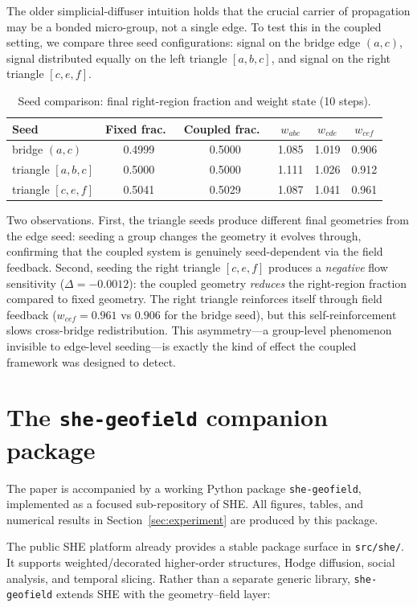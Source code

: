 \documentclass[11pt]{article}
\begin{document}
The older simplicial-diffuser intuition holds that the crucial carrier of propagation may be a bonded micro-group, not a single edge.  To test this in the coupled setting, we compare three seed configurations: signal on the bridge edge $(a,c)$, signal distributed equally on the left triangle $[a,b,c]$, and signal on the right triangle $[c,e,f]$.

\begin{table}[ht]
\centering
\small
\caption{Seed comparison: final right-region fraction and weight state (10 steps).}
\label{tab:seeds}
\begin{tabular}{lccccc}
\toprule
Seed & Fixed frac.\ & Coupled frac.\ & $w_{abc}$ & $w_{cde}$ & $w_{cef}$ \\
\midrule
bridge $(a,c)$ & 0.4999 & 0.5000 & 1.085 & 1.019 & 0.906 \\
triangle $[a,b,c]$ & 0.5000 & 0.5000 & 1.111 & 1.026 & 0.912 \\
triangle $[c,e,f]$ & 0.5041 & 0.5029 & 1.087 & 1.041 & 0.961 \\
\bottomrule
\end{tabular}
\end{table}

Two observations.  First, the triangle seeds produce different final geometries from the edge seed: seeding a group changes the geometry it evolves through, confirming that the coupled system is genuinely seed-dependent via the field feedback.  Second, seeding the right triangle $[c,e,f]$ produces a \emph{negative} flow sensitivity ($\Delta=-0.0012$): the coupled geometry \emph{reduces} the right-region fraction compared to fixed geometry.  The right triangle reinforces itself through field feedback ($w_{cef}=0.961$ vs $0.906$ for the bridge seed), but this self-reinforcement slows cross-bridge redistribution.  This asymmetry---a group-level phenomenon invisible to edge-level seeding---is exactly the kind of effect the coupled framework was designed to detect.

\section{The \texttt{she-geofield} companion package}

The paper is accompanied by a working Python package \texttt{she-geofield}, implemented as a focused sub-repository of SHE.  All figures, tables, and numerical results in Section~\ref{sec:experiment} are produced by this package.

The public SHE platform already provides a stable package surface in \texttt{src/she/}.  It supports weighted/decorated higher-order structures, Hodge diffusion, social analysis, and temporal slicing.  Rather than a separate generic library, \texttt{she-geofield} extends SHE with the geometry--field layer:
\end{document}
